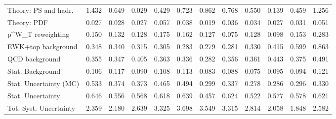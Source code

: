 \begin{tabular}{l|p{0.6cm}p{0.6cm}p{0.6cm}p{0.6cm}p{0.6cm}p{0.6cm}p{0.6cm}p{0.6cm}p{0.6cm}p{0.6cm}p{0.6cm}}
Theory: PS and hadr.                     & 1.432 & 0.649 & 0.029 & 0.429 & 0.723 & 0.862 & 0.768 & 0.550 & 0.139 & 0.459 & 1.256 \\
Theory: PDF                              & 0.027 & 0.028 & 0.027 & 0.057 & 0.038 & 0.019 & 0.036 & 0.034 & 0.027 & 0.031 & 0.051 \\
p^{W}_{T} reweighting                    & 0.150 & 0.132 & 0.128 & 0.175 & 0.162 & 0.127 & 0.075 & 0.128 & 0.098 & 0.153 & 0.283 \\
EWK+top background                       & 0.348 & 0.340 & 0.315 & 0.305 & 0.283 & 0.279 & 0.281 & 0.330 & 0.415 & 0.599 & 0.863 \\
QCD background                           & 0.355 & 0.347 & 0.405 & 0.363 & 0.336 & 0.282 & 0.356 & 0.361 & 0.443 & 0.375 & 0.491 \\
Stat. Background                         & 0.106 & 0.117 & 0.090 & 0.108 & 0.113 & 0.083 & 0.088 & 0.075 & 0.095 & 0.094 & 0.121 \\
Stat. Uncertainty (MC)                   & 0.533 & 0.374 & 0.373 & 0.465 & 0.494 & 0.299 & 0.337 & 0.278 & 0.286 & 0.296 & 0.330 \\
\hline
Stat. Uncertainty                        & 0.646 & 0.556 & 0.568 & 0.618 & 0.639 & 0.457 & 0.624 & 0.522 & 0.577 & 0.578 & 0.621 \\
\hline
Tot. Syst. Uncertainty                   & 2.359 & 2.180 & 2.639 & 3.325 & 3.698 & 3.549 & 3.315 & 2.814 & 2.058 & 1.848 & 2.582 \\
\hline
\end{tabular}
